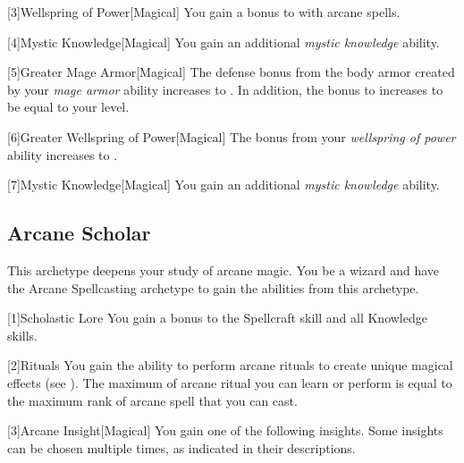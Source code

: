         [3]{Wellspring of Power}[Magical]
        You gain a  bonus to  with arcane spells.

        [4]{Mystic Knowledge}[Magical]
        You gain an additional \textit{mystic knowledge} ability.

        [5]{Greater Mage Armor}[Magical]
        The defense bonus from the body armor created by your \textit{mage armor} ability increases to .
        In addition, the bonus to  increases to be equal to your level.

        [6]{Greater Wellspring of Power}[Magical]
        The bonus from your \textit{wellspring of power} ability increases to .

        [7]{Mystic Knowledge}[Magical]
        You gain an additional \textit{mystic knowledge} ability.

    \subsection{Arcane Scholar}
        This archetype deepens your study of arcane magic.
        You be a wizard and have the Arcane Spellcasting archetype to gain the abilities from this archetype.

        [1]{Scholastic Lore} You gain a  bonus to the Spellcraft skill and all Knowledge skills.

        [2]{Rituals} You gain the ability to perform arcane rituals to create unique magical effects (see ).
        The maximum  of arcane ritual you can learn or perform is equal to the maximum rank of arcane spell that you can cast.

        [3]{Arcane Insight}[Magical]
        You gain one of the following insights.
        Some insights can be chosen multiple times, as indicated in their descriptions.

